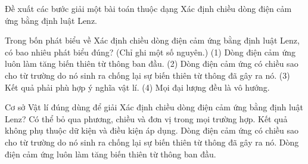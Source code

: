 \begin{bt}
Đề xuất các bước giải một bài toán thuộc dạng Xác định chiều dòng điện cảm ứng bằng định luật Lenz.
\end{bt}

\begin{ex}
Trong bốn phát biểu về Xác định chiều dòng điện cảm ứng bằng định luật Lenz, có bao nhiêu phát biểu đúng? (Chỉ ghi một số nguyên.) (1) Dòng điện cảm ứng luôn làm tăng biến thiên từ thông ban đầu. (2) Dòng điện cảm ứng có chiều sao cho từ trường do nó sinh ra chống lại sự biến thiên từ thông đã gây ra nó. (3) Kết quả phải phù hợp ý nghĩa vật lí. (4) Mọi đại lượng đều là vô hướng.
\end{ex}

\begin{ex}
Cơ sở Vật lí đúng dùng để giải Xác định chiều dòng điện cảm ứng bằng định luật Lenz?
\choice
{Có thể bỏ qua phương, chiều và đơn vị trong mọi trường hợp.}
{Kết quả không phụ thuộc dữ kiện và điều kiện áp dụng.}
{\True Dòng điện cảm ứng có chiều sao cho từ trường do nó sinh ra chống lại sự biến thiên từ thông đã gây ra nó.}
{Dòng điện cảm ứng luôn làm tăng biến thiên từ thông ban đầu.}
\end{ex}

